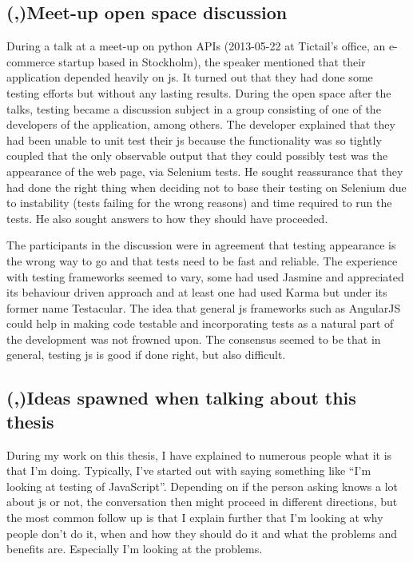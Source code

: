 \documentclass[11pt]{article}
\begin{document}
\subsection{(,)Meet-up open space discussion}
\label{subsec:openspace}

During a talk at a meet-up on python APIs (2013-05-22 at Tictail's office, an e-commerce startup based in Stockholm), the speaker mentioned that their application depended heavily on \gls{js}. It turned out that they had done some testing efforts but without any lasting results. During the open space after the talks, testing became a discussion subject in a group consisting of one of the developers of the application, among others. The developer explained that they had been unable to unit test their \gls{js} because the functionality was so tightly coupled that the only observable output that they could possibly test was the appearance of the web page, via Selenium tests. He sought reassurance that they had done the right thing when deciding not to base their testing on Selenium due to instability (tests failing for the wrong reasons) and time required to run the tests. He also sought answers to how they should have proceeded.

The participants in the discussion were in agreement that testing appearance is the wrong way to go and that tests need to be fast and reliable. The experience with testing frameworks seemed to vary, some had used Jasmine and appreciated its behaviour driven approach and at least one had used Karma but under its former name Testacular. The idea that general \gls{js} frameworks such as AngularJS could help in making code testable and incorporating tests as a natural part of the development was not frowned upon. The consensus seemed to be that in general, testing \gls{js} is good if done right, but also difficult.

\subsection{(,)Ideas spawned when talking about this thesis}

During my work on this thesis, I have explained to numerous people what it is that I'm doing. Typically, I've started out with saying something like ``I'm looking at testing of JavaScript''. Depending on if the person asking knows a lot about \gls{js} or not, the conversation then might proceed in different directions, but the most common follow up is that I explain further that I'm looking at why people don't do it, when and how they should do it and what the problems and benefits are. Especially I'm looking at the problems.
\end{document}
